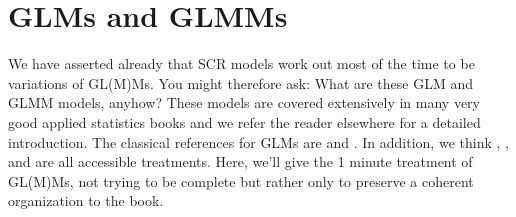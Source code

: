\section{
GLMs and GLMMs}
\label{glms.sec.glmms}
We have asserted already that SCR models work out most of the time to
be variations of GL(M)Ms. You might therefore ask: What
are these GLM and GLMM models, anyhow?   These models are covered extensively in
many very good applied statistics books and we refer the reader
elsewhere for a detailed introduction.  The
classical references for GLMs are \citet{nelder_wedderburn:1972} and
 \citet{mccullagh_nelder:1989}. In addition, we think \citet{kery:2010},
\citet{kery_schaub:2011}, and \citet{zuur_etal:2009} are all
accessible treatments.
Here, we'll give the 1
minute
treatment of GL(M)Ms, not trying to be complete but rather only
to preserve a coherent organization to the book.


